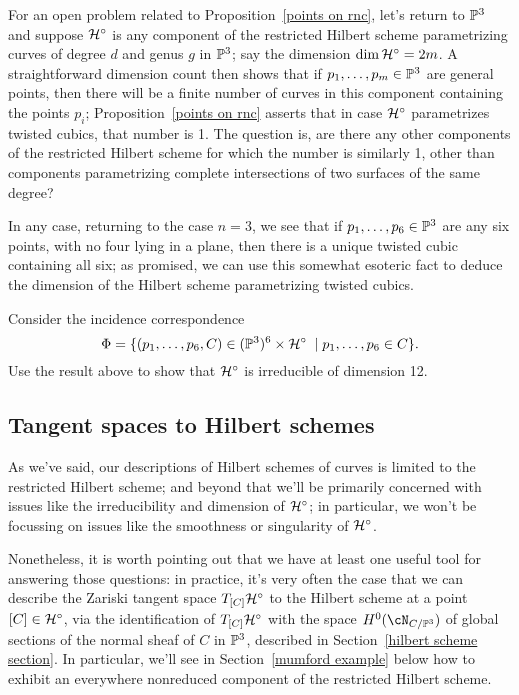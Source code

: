 For an open problem related to Proposition~\ref{points on rnc}, let's return to $\PP^3$ and suppose $\cH^\circ$ is  any component of the restricted Hilbert scheme parametrizing curves of degree $d$ and genus $g$ in $\PP^3$; say the dimension $\dim \cH^\circ = 2m$. A straightforward dimension count then shows that if $p_1,\dots,p_m \in \PP^3$ are general points, then there will be a finite number of curves in this component containing the points $p_i$; Proposition~\ref{points on rnc} asserts that in case $\cH^\circ$ parametrizes twisted cubics, that number is 1. The question is, are there any other components of the restricted Hilbert scheme for which the number is similarly 1, other than components parametrizing complete intersections of two surfaces of the same degree?

In any case, returning to the case $n=3$, we see that if $p_1,\dots,p_6 \in \PP^3$ are any six points, with no four lying in a plane, then there is a unique twisted cubic containing all six; as promised, we can use this somewhat esoteric fact to deduce the dimension of the Hilbert scheme parametrizing twisted cubics.

\begin{exercise}
Consider the incidence correspondence
$$
\Phi = \{ (p_1,\dots,p_6, C) \in (\PP^3)^6 \times \cH^\circ \; \mid p_1,\dots,p_6 \in C  \}.
$$
Use the result above to show that $\cH^\circ$ is irreducible of dimension 12.
\end{exercise}

\subsection{Tangent spaces to Hilbert schemes}

As we've said, our descriptions of Hilbert schemes of curves is limited to the restricted Hilbert scheme; and beyond that we'll be primarily concerned with issues like the irreducibility and dimension of $\cH^\circ$; in particular, we won't be focussing on issues like the smoothness or singularity of $\cH^\circ$. 

Nonetheless, it is worth pointing out that we have at least one useful tool for answering those questions: in practice, it's very often the case that we can describe the Zariski tangent space $T_{[C]}\cH^\circ$ to the Hilbert scheme at a point $[C] \in \cH^\circ$, via the identification of $T_{[C]}\cH^\circ$ with the space $H^0(\cN_{C/\PP^3})$ of global sections of the normal sheaf of $C$ in $\PP^3$, described in Section~\ref{hilbert scheme section}. In particular, we'll see in Section~\ref{mumford example} below how to exhibit an everywhere nonreduced component of the restricted Hilbert scheme.

